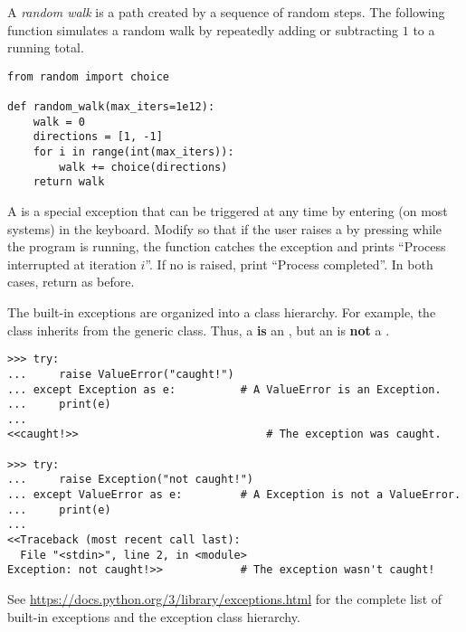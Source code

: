 \begin{problem} %
A \emph{random walk} is a path created by a sequence of random steps.
The following function simulates a random walk by repeatedly adding or subtracting $1$ to a running total.

\begin{lstlisting}
from random import choice

def random_walk(max_iters=1e12):
    walk = 0
    directions = [1, -1]
    for i in range(int(max_iters)):
        walk += choice(directions)
    return walk
\end{lstlisting}

A  is a special exception that can be triggered at any time by entering  (on most systems) in the keyboard.
Modify  so that if the user raises a  by pressing  while the program is running, the function catches the exception and prints ``Process interrupted at iteration $i$''.
If no  is raised, print ``Process completed''.
In both cases, return  as before.
\end{problem}

\begin{info} %
The built-in exceptions are organized into a class hierarchy.
For example, the  class inherits from the generic  class.
Thus, a  \textbf{is} an , but an  is \textbf{not} a .

\begin{lstlisting}
>>> try:
...     raise ValueError("caught!")
... except Exception as e:          # A ValueError is an Exception.
...     print(e)
...
<<caught!>>                             # The exception was caught.

>>> try:
...     raise Exception("not caught!")
... except ValueError as e:         # A Exception is not a ValueError.
...     print(e)
...
<<Traceback (most recent call last):
  File "<stdin>", line 2, in <module>
Exception: not caught!>>            # The exception wasn't caught!
\end{lstlisting}

See \url{https://docs.python.org/3/library/exceptions.html} for the complete list of built-in exceptions and the exception class hierarchy.
\end{info}

